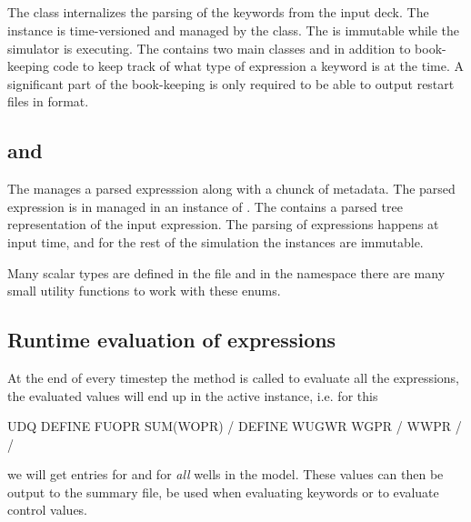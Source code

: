 \subsection*{}
The class  internalizes the parsing of the \udq{} keywords
from the input deck. The  instance is time-versioned and
managed by the  class. The  is
immutable while the simulator is executing. The  contains
two main classes  and  in addition
to book-keeping code to keep track of what type of expression a \udq{} keyword
is at the time. A significant part of the book-keeping is only required to be
able to output restart files in \eclipse{} format.

\subsection*{ and }
The  manages a parsed \udq{} expresssion along with a
chunck of metadata. The parsed \udq{} expression is in managed in an instance of
. The  contains a parsed tree
representation of the \udq{} input expression. The parsing of \udq{} expressions
happens at input time, and for the rest of the simulation the
 instances are immutable.

Many scalar \udq{} types are defined in the file  and in the
namespace  there are many small utility functions to work with
these enums.


\subsection*{Runtime evaluation of \udq{} expressions}
At the end of every timestep the  method is called
to evaluate all the \udq{} expressions, the evaluated values will end up in the
active  instance, i.e. for this \udq{}
\begin{deck}
UDQ
  DEFINE FUOPR SUM(WOPR) /
  DEFINE WUGWR WGPR / WWPR /
/
\end{deck}
we will get  entries for  and  for
\emph{all} wells in the model. These  values can then
be output to the summary file, be used when evaluating  keywords or
to evaluate  control values.

